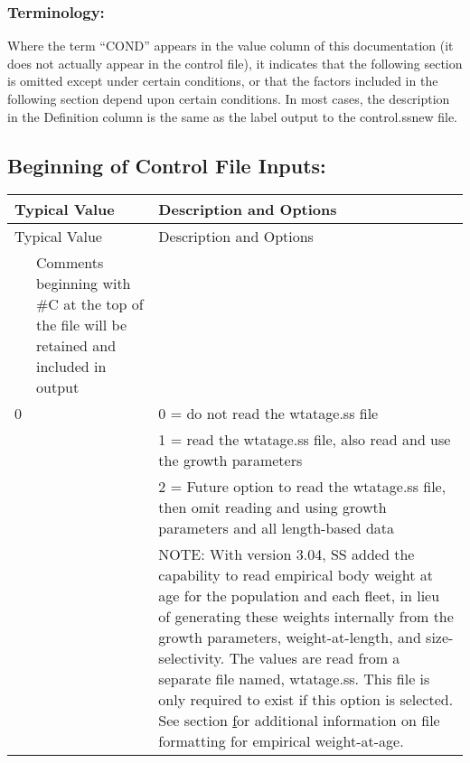 \subsubsection{Terminology:}
Where the term “COND” appears in the value column of this documentation (it does not actually appear in the control file), it indicates that the following section is omitted except under certain conditions, or that the factors included in the following section depend upon certain conditions.
In most cases, the description in the Definition column is the same as the label output to the control.ss\textunderscore new file.

\subsection{Beginning of Control File Inputs:}
\begin{center}

	\begin{longtable}{p{0.5cm} p{2cm} p{12cm}}

		\multicolumn{2}{l}{Typical Value} & Description and Options\\
		\hline
		\endfirsthead

		\multicolumn{2}{l}{Typical Value} & Description and Options\\
		\hline
		\endhead

		\hline
		\endfoot

		\endlastfoot

		\multicolumn{2}{l}{\#C comment } & Comments beginning with \#C at the top of the file will be retained and included in output  \\
		\hline

		0 & & 0 = do not read the wtatage.ss file \\
		  & & 1 = read the wtatage.ss file, also read and use the growth parameters \\
		  & & 2 = Future option to read the wtatage.ss file, then omit reading and using growth parameters and all length-based data\\
		  & &   NOTE:  With version 3.04, SS added the capability to read empirical body weight at age for the population and each fleet, in lieu of generating these weights internally from the growth parameters, weight-at-length, and size-selectivity.  The values are read from a separate file named, wtatage.ss.  This file is only required to exist if this option is selected.  See section \hyperlink{WAA} for additional information on file formatting for empirical weight-at-age.\\



\end{longtable}
\end{center}
